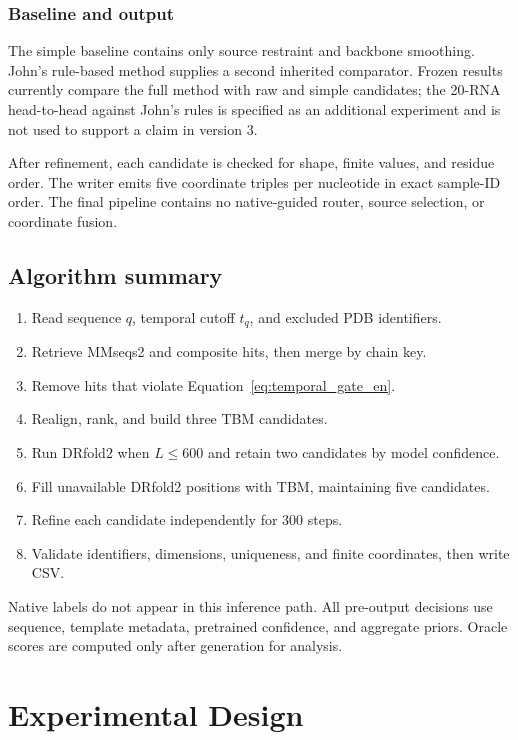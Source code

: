 \documentclass[12pt,a4paper,oneside]{report}
\begin{document}
\subsection{Baseline and output}

The simple baseline contains only source restraint and backbone smoothing. John's
rule-based method supplies a second inherited comparator. Frozen results currently
compare the full method with raw and simple candidates; the 20-RNA head-to-head against
John's rules is specified as an additional experiment and is not used to support a claim
in version 3.

After refinement, each candidate is checked for shape, finite values, and residue order.
The writer emits five coordinate triples per nucleotide in exact sample-ID order. The
final pipeline contains no native-guided router, source selection, or coordinate fusion.

\section{Algorithm summary}

\begin{enumerate}
  \item Read sequence $q$, temporal cutoff $t_q$, and excluded PDB identifiers.
  \item Retrieve MMseqs2 and composite hits, then merge by chain key.
  \item Remove hits that violate Equation~\ref{eq:temporal_gate_en}.
  \item Realign, rank, and build three TBM candidates.
  \item Run DRfold2 when $L\leq600$ and retain two candidates by model confidence.
  \item Fill unavailable DRfold2 positions with TBM, maintaining five candidates.
  \item Refine each candidate independently for 300 steps.
  \item Validate identifiers, dimensions, uniqueness, and finite coordinates, then write CSV.
\end{enumerate}

Native labels do not appear in this inference path. All pre-output decisions use sequence,
template metadata, pretrained confidence, and aggregate priors. Oracle scores are
computed only after generation for analysis.

\chapter{Experimental Design}
\label{chap:experiment_en}
\end{document}
